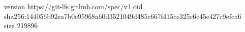 version https://git-lfs.github.com/spec/v1
oid sha256:144056b92ea7b0e95968a60d3521049d485c667f415ce325c6c45e427c9efca6
size 219896
